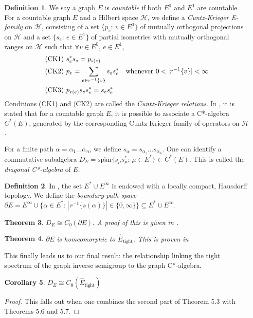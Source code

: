 \documentclass[12pt]{article}
\newtheorem{theorem}{Theorem}[section]
\newtheorem{corollary}[theorem]{Corollary}
\theoremstyle{definition}
\newtheorem{definition}[theorem]{Definition}
\begin{document}
\begin{definition} \parencite[Chapter 5]{raeburn}
    We say a graph $E$ is \emph{countable} if both $E^0$ and $E^1$ are countable.
    For a countable graph $E$ and a Hilbert space $\mathcal{H}$, we define
    a \emph{Cuntz-Krieger E-family} on $\mathcal{H}$, consisting of a set 
    $\{p_v\text{: } v \in E^0\}$ of mutually orthogonal projections on $\mathcal{H}$
    and a set $\{s_e\text{: } e \in E^1\}$ of partial isometries with mutually orthogonal ranges
    on $\mathcal{H}$ such that $\forall v \in E^0$, $e \in E^1$,
    \begin{align*}
        &\text{(CK1) } s_e^* s_e = p_{s(e)} \\
        &\text{(CK2) } p_v = \sum_{e \in r^{-1}\{v\}} s_e s_e^* \text{\quad whenever } 0 < |r^{-1}\{v\}| < \infty \\
        &\text{(CK3) } p_{r(e)} s_e s_e^* = s_e s_e^*
    \end{align*}
    Conditions (CK1) and (CK2) are called the \emph{Cuntz-Krieger relations}.
    In \parencite[Definition 1]{infgraphs}, it is stated that for a countable graph $E$, 
    it is possible to associate a C*-algebra $C^*(E)$, generated by the corresponding Cuntz-Krieger
    family of operators on $\mathcal{H}$.
\end{definition} 
For a finite path $\alpha = \alpha_1 ... \alpha_n$, we define $s_\alpha = s_{\alpha_1} ... s_{\alpha_n}$.
One can identify a commutative subalgebra $D_E = \overline{\text{span}}\{s_\mu s_\mu^*\text{: } \mu \in E^*\} \subset C^*(E)$.
This is called the \emph{diagonal C*-algebra} of $E$.

\begin{definition}
    In \cite[Theorem 2.1]{webster}, the set $E^* \cup E^\infty$ is endowed with
    a locally compact, Hausdorff topology. We define the \emph{boundary path space}
    $\partial E = E^\infty \cup \{\alpha \in E^*\text{: } |r^{-1}\{s(\alpha)\}| \in \{0, \infty\}\} \subseteq E^* \cup E^\infty$.
\end{definition}

\begin{theorem} $D_E \cong C_0(\partial E)$. \emph{A proof of this is given in \cite[Theorem 3.7]{webster}.} \end{theorem}

\begin{theorem} $\partial E$ is homeomorphic to $\hat{E}_\text{tight}$. \emph{This is proven in \cite[Example 6.8]{boava}} \end{theorem}

This finally leads us to our final result: the relationship linking the tight 
spectrum of the graph inverse semigroup to the graph C*-algebra.
\begin{corollary} $D_E \cong C_0(\hat{E}_\text{tight})$ \end{corollary}
\begin{proof}
    This falls out when one combines the second part of Theorem 5.3 with Theorems 5.6 and 5.7.
\end{proof}

\printbibliography
\end{document}
